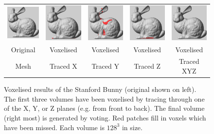 \begin{figure}
  \centering
  \begin{tabular}{ccccc}
    \includegraphics[width=0.17\linewidth]{imggen/vox_xyz/bunny_original.png} &
    \includegraphics[width=0.17\linewidth]{imggen/vox_xyz/bunny_voxX.png} &
    \includegraphics[width=0.17\linewidth]{imggen/vox_xyz/bunny_voxY.png} &
    \includegraphics[width=0.17\linewidth]{imggen/vox_xyz/bunny_voxZ.png} &
    \includegraphics[width=0.17\linewidth]{imggen/vox_xyz/bunny_voxXYZ.png} \\
    Original & Voxelised & Voxelised & Voxelised & Voxelised \\
    Mesh     & Traced X  & Traced Y  & Traced Z  & Traced XYZ \\
  \end{tabular}
  \caption[Voxelisation error due to limiting ray tracing
  directions]{Voxelised results of the Stanford Bunny (original shown
    on left). The first three volumes have been voxelised by tracing
    through one of the X, Y, or Z planes (e.g. from front to
    back). The final volume (right most) is generated by voting. Red
    patches fill in voxels which have been missed. Each volume is
    $128^3$ in size.}
  \label{fig:background:voltracing}
\end{figure}

